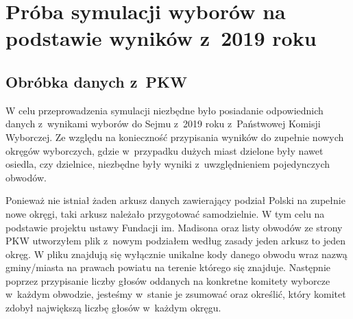 \def\filename{Rozdział 3}

\chapter{Próba symulacji wyborów na podstawie wyników z~2019 roku}

\section{Obróbka danych z~PKW}
W celu przeprowadzenia symulacji niezbędne było posiadanie odpowiednich danych z~wynikami wyborów do Sejmu z~2019 roku z~Państwowej Komisji Wyborczej. Ze względu na konieczność przypisania wyników do zupełnie nowych okręgów wyborczych, gdzie w~przypadku dużych miast dzielone były nawet osiedla, czy dzielnice, niezbędne były wyniki z~uwzględnieniem pojedynczych obwodów.

Ponieważ nie istniał żaden arkusz danych zawierający podział Polski na zupełnie nowe okręgi, taki arkusz należało przygotować samodzielnie. W tym celu na podstawie projektu ustawy Fundacji im. Madisona oraz listy obwodów ze strony PKW utworzyłem plik z~nowym podziałem według zasady jeden arkusz to jeden okręg. W pliku znajdują się wyłącznie unikalne kody danego obwodu wraz nazwą gminy/miasta na prawach powiatu na terenie którego się znajduje.
Następnie poprzez przypisanie liczby głosów oddanych na konkretne komitety wyborcze w~każdym obwodzie, jesteśmy w~stanie je zsumować oraz określić, który komitet zdobył największą liczbę głosów w~każdym okręgu.


